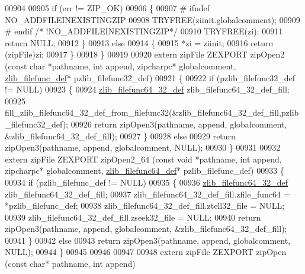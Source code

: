 \begin{DoxyCode}
00904 
00905     \textcolor{keywordflow}{if} (err != ZIP\_OK)
00906     \{
00907 \textcolor{preprocessor}{#    ifndef NO\_ADDFILEINEXISTINGZIP}
00908         TRYFREE(ziinit.globalcomment);
00909 \textcolor{preprocessor}{#    endif }\textcolor{comment}{/* !NO\_ADDFILEINEXISTINGZIP*/}\textcolor{preprocessor}{}
00910         TRYFREE(zi);
00911         \textcolor{keywordflow}{return} NULL;
00912     \}
00913     \textcolor{keywordflow}{else}
00914     \{
00915         *zi = ziinit;
00916         \textcolor{keywordflow}{return} (zipFile)zi;
00917     \}
00918 \}
00919 
00920 \textcolor{keyword}{extern} zipFile ZEXPORT zipOpen2 (\textcolor{keyword}{const} \textcolor{keywordtype}{char} *pathname, \textcolor{keywordtype}{int} append, zipcharpc* globalcomment, 
      \hyperlink{structzlib__filefunc__def__s}{zlib\_filefunc\_def}* pzlib\_filefunc32\_def)
00921 \{
00922     \textcolor{keywordflow}{if} (pzlib\_filefunc32\_def != NULL)
00923     \{
00924         \hyperlink{structzlib__filefunc64__32__def__s}{zlib\_filefunc64\_32\_def} zlib\_filefunc64\_32\_def\_fill;
00925         fill\_zlib\_filefunc64\_32\_def\_from\_filefunc32(&zlib\_filefunc64\_32\_def\_fill,pzlib\_filefunc32\_def);
00926         \textcolor{keywordflow}{return} zipOpen3(pathname, append, globalcomment, &zlib\_filefunc64\_32\_def\_fill);
00927     \}
00928     \textcolor{keywordflow}{else}
00929         \textcolor{keywordflow}{return} zipOpen3(pathname, append, globalcomment, NULL);
00930 \}
00931 
00932 \textcolor{keyword}{extern} zipFile ZEXPORT zipOpen2\_64 (\textcolor{keyword}{const} \textcolor{keywordtype}{void} *pathname, \textcolor{keywordtype}{int} append, zipcharpc* globalcomment, 
      \hyperlink{structzlib__filefunc64__def__s}{zlib\_filefunc64\_def}* pzlib\_filefunc\_def)
00933 \{
00934     \textcolor{keywordflow}{if} (pzlib\_filefunc\_def != NULL)
00935     \{
00936         \hyperlink{structzlib__filefunc64__32__def__s}{zlib\_filefunc64\_32\_def} zlib\_filefunc64\_32\_def\_fill;
00937         zlib\_filefunc64\_32\_def\_fill.zfile\_func64 = *pzlib\_filefunc\_def;
00938         zlib\_filefunc64\_32\_def\_fill.ztell32\_file = NULL;
00939         zlib\_filefunc64\_32\_def\_fill.zseek32\_file = NULL;
00940         \textcolor{keywordflow}{return} zipOpen3(pathname, append, globalcomment, &zlib\_filefunc64\_32\_def\_fill);
00941     \}
00942     \textcolor{keywordflow}{else}
00943         \textcolor{keywordflow}{return} zipOpen3(pathname, append, globalcomment, NULL);
00944 \}
00945 
00946 
00947 
00948 \textcolor{keyword}{extern} zipFile ZEXPORT zipOpen (\textcolor{keyword}{const} \textcolor{keywordtype}{char}* pathname, \textcolor{keywordtype}{int} append)

\end{DoxyCode}
